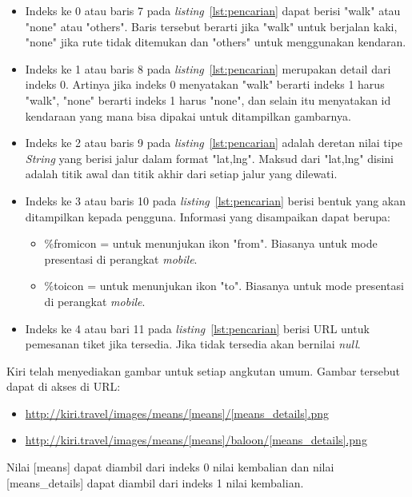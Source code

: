 \begin{itemize}
	\item Indeks ke 0 atau baris 7 pada \textit{listing}~\ref{lst:pencarian} dapat berisi "walk" atau "none" atau "others". Baris tersebut berarti jika "walk" untuk berjalan kaki, "none" jika rute tidak ditemukan dan "others" untuk menggunakan kendaran.
	\item Indeks ke 1 atau baris 8 pada \textit{listing}~\ref{lst:pencarian} merupakan detail dari indeks 0. Artinya jika indeks 0 menyatakan "walk" berarti indeks 1 harus "walk", "none" berarti indeks 1 harus "none", dan selain itu menyatakan id kendaraan yang mana bisa dipakai untuk ditampilkan gambarnya.
	\item Indeks ke 2 atau baris 9 pada \textit{listing}~\ref{lst:pencarian} adalah deretan nilai tipe \textit{String} yang berisi jalur dalam format "lat,lng". Maksud dari "lat,lng" disini adalah titik awal dan titik akhir dari setiap jalur yang dilewati.
	\item Indeks ke 3 atau baris 10 pada \textit{listing}~\ref{lst:pencarian} berisi bentuk yang akan ditampilkan kepada pengguna. Informasi yang disampaikan dapat berupa:
		\begin{itemize}
			\item \%fromicon = untuk menunjukan ikon "from". Biasanya untuk mode presentasi di perangkat \textit{mobile}.
			\item \%toicon = untuk menunjukan ikon "to". Biasanya untuk mode presentasi di perangkat \textit{mobile}. 
		\end{itemize}
	\item Indeks ke 4 atau bari 11 pada \textit{listing}~\ref{lst:pencarian} berisi URL untuk pemesanan tiket jika tersedia. Jika tidak tersedia akan bernilai \textit{null}.
\end{itemize}

\hspace{0.5cm} Kiri telah menyediakan gambar untuk setiap angkutan umum. Gambar tersebut dapat di akses di URL:
\begin{itemize}
	\item \url{http://kiri.travel/images/means/[means]/[means_details].png}
	\item \url{http://kiri.travel/images/means/[means]/baloon/[means_details].png}
\end{itemize}
Nilai [means] dapat diambil dari indeks 0 nilai kembalian dan nilai [means\_details] dapat diambil dari indeks 1 nilai kembalian. 
		
